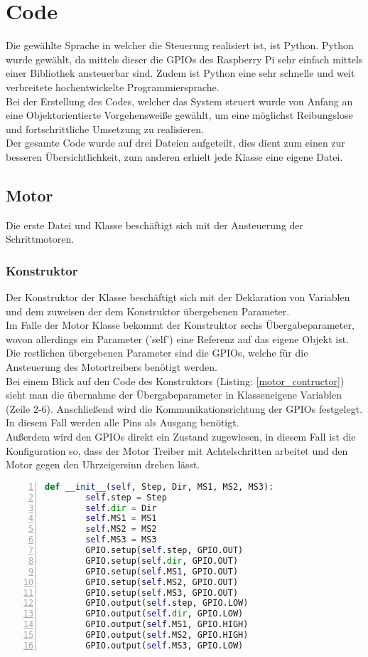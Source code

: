 
\chapter{Code}
Die gewählte Sprache in welcher die Steuerung realisiert ist, ist Python. Python wurde gewählt, da mittels dieser die \acp{GPIO} des Raspberry Pi sehr einfach mittels einer Bibliothek ansteuerbar sind. Zudem ist Python eine sehr schnelle und weit verbreitete hochentwickelte Programmiersprache.\\
Bei der Erstellung des Codes, welcher das System steuert wurde von Anfang an eine Objektorientierte Vorgehensweiße gewählt, um eine möglichst Reibungslose und fortschrittliche Umsetzung zu realisieren.\\
Der gesamte Code wurde auf drei Dateien aufgeteilt, dies dient zum einen zur besseren Übersichtlichkeit, zum anderen erhielt jede Klasse eine eigene Datei.
\section{Motor}
Die erste Datei und Klasse beschäftigt sich mit der Ansteuerung der Schrittmotoren.\\
\subsection{Konstruktor} 
Der Konstruktor der Klasse beschäftigt sich mit der Deklaration von Variablen und dem zuweisen der dem Konstruktor übergebenen Parameter.\\
Im Falle der Motor Klasse bekommt der Konstruktor sechs Übergabeparameter, wovon allerdings ein Parameter ('self') eine Referenz auf das eigene Objekt ist.\\
Die restlichen übergebenen Parameter sind die \acp{GPIO}, welche für die Ansteuerung des Motortreibers benötigt werden.\\
Bei einem Blick auf den Code des Konstruktors (Listing: \ref{motor_contructor}) sieht man die übernahme der Übergabeparameter in Klasseneigene Variablen (Zeile 2-6). Anschließend wird die Kommunikationsrichtung der \acp{GPIO} festgelegt. In diesem Fall werden alle Pins als Ausgang benötigt.\\
Außerdem wird den \acp{GPIO} direkt ein Zustand zugewiesen, in diesem Fall ist die Konfiguration so, dass der Motor Treiber mit Achtelschritten arbeitet und den Motor gegen den  Uhrzeigersinn drehen lässt.
\begin{lstlisting}[caption={Konstruktor der Motor Klasse}, language={Python}, label={motor_contructor}, numbers=left]
def __init__(self, Step, Dir, MS1, MS2, MS3):
        self.step = Step
        self.dir = Dir
        self.MS1 = MS1
        self.MS2 = MS2
        self.MS3 = MS3
        GPIO.setup(self.step, GPIO.OUT)
        GPIO.setup(self.dir, GPIO.OUT)
        GPIO.setup(self.MS1, GPIO.OUT)
        GPIO.setup(self.MS2, GPIO.OUT)
        GPIO.setup(self.MS3, GPIO.OUT)
        GPIO.output(self.step, GPIO.LOW)
        GPIO.output(self.dir, GPIO.LOW)
        GPIO.output(self.MS1, GPIO.HIGH)
        GPIO.output(self.MS2, GPIO.HIGH)
        GPIO.output(self.MS3, GPIO.LOW)
\end{lstlisting}

